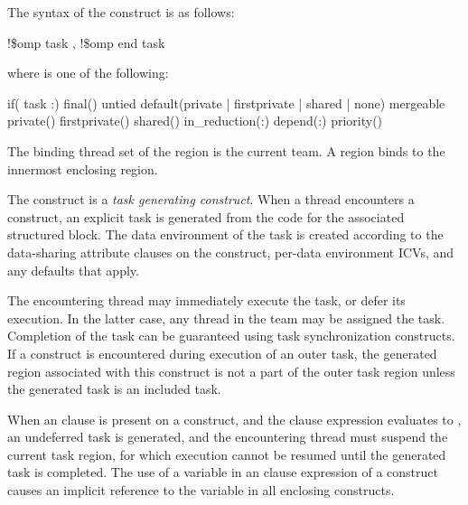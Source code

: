 \fortranspecificstart
The syntax of the  construct is as follows: 

\begin{boxedcode}
!\$omp task \plc{[clause[ [},\plc{] clause] ... ]}
!\$omp end task
\end{boxedcode}

where  is one of the following:

\begin{indentedcodelist}
if(\plc{[} task :\plc{] scalar-logical-expression})
final()
untied
default(private \textnormal{|} firstprivate \textnormal{|} shared \textnormal{|} none)
mergeable
private()
firstprivate()
shared()
in_reduction(:)
depend(:)
priority()
\end{indentedcodelist}
\fortranspecificend

\binding
The binding thread set of the  region is the current team. A  region binds to 
the innermost enclosing  region. 

\descr

The  construct is a \emph{task generating construct}. When a thread
encounters a  construct, an explicit task is generated from the code
for the associated structured block. The data environment of the task is
created according to the data-sharing attribute clauses on the 
construct, per-data environment ICVs, and any defaults that apply.

The encountering thread may immediately execute the task, or defer its execution. In the 
latter case, any thread in the team may be assigned the task. Completion of the task can 
be guaranteed using task synchronization constructs. 
If a  construct is encountered during execution of an outer
task, the generated  region associated with this construct is not a
part of the outer task region unless the generated task is
an included task.

When an  clause is present on a  construct, and the  clause expression 
evaluates to , an undeferred task is generated, and the encountering thread must 
suspend the current task region, for which execution cannot be resumed until the 
generated task is completed. The use of a variable in an  clause expression 
of a  construct causes an implicit reference to the variable in all enclosing 
constructs.

